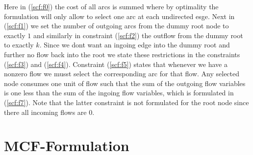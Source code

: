 \documentclass[11pt]{article}
\begin{document}
Here in (\ref{scf:f0}) the cost of all arcs is summed where by optimality the formulation will only allow to select one arc at each undirected esge. Next in (\ref{scf:f1}) we set the number of outgoing arcs from the dummy root node to exactly $1$ and similarly in constraint (\ref{scf:f2}) the outflow from the dummy root to exactly $k$. Since we dont want an ingoing edge into the dummy root and further no flow back into the root we state these restrictions in the constraints (\ref{scf:f3}) and (\ref{scf:f4}). Constraint (\ref{scf:f5}) states that whenever we have a nonzero flow we musst select the corresponding arc for that flow. Any selected node consumes one unit of flow such that the sum of the outgoing flow variables is one less than the sum of the ingoing flow variables, which is formulated in (\ref{scf:f7}). Note that the latter constraint is not formulated for the root node since there all incoming flows are $0$. 


\section{MCF-Formulation}
\end{document}
